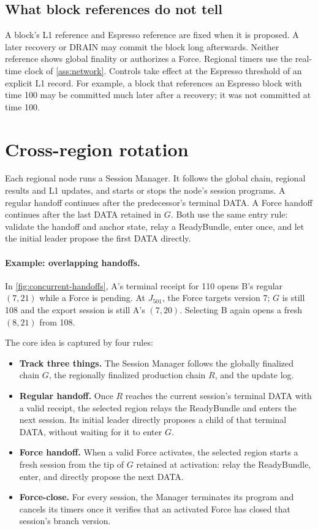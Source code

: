\documentclass[11pt,a4paper]{article}
\newcounter{protocol}
\begin{document}
\subsection{What block references do not tell}
\label{sec:late-receipt}
A block's L1 reference and Espresso reference are fixed when it
is proposed. A later recovery or DRAIN may commit the block long
afterwards. Neither reference shows global finality or authorizes a
Force. Regional timers use the real-time clock of \cref{ass:network}.
Controls take effect at the Espresso threshold of an explicit L1 record.
For example, a block that references an Espresso block with time 100 may
be committed much later after a recovery; it was not committed at time
100.

\section{Cross-region rotation}
\label{sec:xprotocols}
Each regional node runs a Session Manager. It follows the global chain,
regional results and L1 updates, and starts or stops the node's session
programs. A regular handoff continues after the predecessor's terminal
DATA. A Force handoff continues after the last DATA retained in $G$.
Both use the same entry rule: validate the handoff and anchor state,
relay a ReadyBundle, enter once, and let the initial leader propose the
first DATA directly.

\paragraph{Example: overlapping handoffs.}
In \cref{fig:concurrent-handoffs}, A's terminal receipt for 110 opens
B's regular $(7,21)$ while a Force is pending. At $J_{501}$, the Force
targets version 7; $G$ is still 108 and the export session is still
A's $(7,20)$. Selecting B again opens a fresh $(8,21)$ from 108.

The core idea is captured by four rules:
\begin{itemize}[itemsep=2pt]
\item \textbf{Track three things.} The Session Manager follows the
globally finalized chain $G$, the regionally finalized production chain
$R$, and the update log.
\item \textbf{Regular handoff.} Once $R$ reaches the current session's
terminal DATA with a valid receipt, the selected region relays the
ReadyBundle and enters the next session. Its initial leader directly
proposes a child of that terminal DATA, without waiting for it to enter $G$.
\item \textbf{Force handoff.} When a valid Force activates, the selected
region starts a fresh session from the tip of $G$ retained at activation:
relay the ReadyBundle, enter, and directly propose the next DATA.
\item \textbf{Force-close.} For every session, the Manager terminates its
program and cancels its timers once it verifies that an activated Force
has closed that session's branch version.
\end{itemize}
\end{document}
